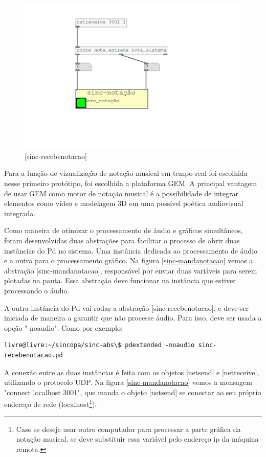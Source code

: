 \documentclass[draft]{ppgmus}
\begin{document}
\begin{figure}
\includegraphics[scale=.6]{sinc-recebenotacao}
\caption{[sinc-recebenotacao]}
\label{sinc-recebenotacao}
\end{figure} 

Para a função de vizualização de notação musical
em tempo-real foi escolhida nesse primeiro protótipo, foi escolhida a plataforma GEM.
A principal vantagem de usar GEM como motor de notação musical é a possibilidade
de integrar elementos como vídeo e modelagem 3D em uma possível poética audiovisual integrada.

Como maneira de otimizar o processamento de áudio e gráficos simultâneos, foram desenvolvidas
 duas abstrações para facilitar o processo de abrir duas instâncias do Pd no sistema. Uma instância dedicada
ao processamento de áudio e a outra para o processamento gráfico.
Na figura \ref{sinc-mandanotacao} vemos a abstração [sinc-mandanotacao], responsável por enviar duas variáveis
para serem plotadas na pauta. Essa abstração deve funcionar na instância que estiver processando o áudio.

A outra instância do Pd vai rodar a abstração [sinc-recebenotacao], e deve ser iniciada de maneira a garantir 
que não processe áudio. Para isso, deve ser usada a opção "-noaudio".
Como por exemplo:

\begin{verbatim}
livre@livre:~/sincopa/sinc-abs\$ pdextended -noaudio sinc-recebenotacao.pd 
\end{verbatim} 

A conexão entre as duas instâncias é feita com os objetos [netsend] e [netreceive], utilizando o protocolo
UDP. Na figura \ref{sinc-mandanotacao} vemos a mensagem "connect localhost 3001", que manda o objeto
[netsend] se conectar ao seu próprio endereço de rede (localhost\footnote{Caso se deseje usar outro computador
para processar a parte gráfica da notação musical, se deve substituir essa variável pelo endereço ip da máquina remota.}).
\end{document}
